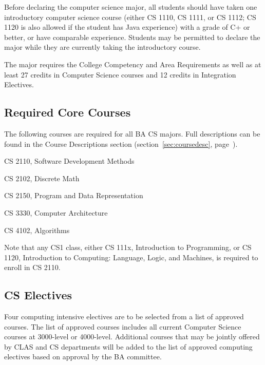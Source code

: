 

Before declaring the computer science major, all students should have
taken one introductory computer science course (either CS 1110, CS
1111, or CS 1112; CS 1120 is also allowed if the student has Java
experience) with a grade of C+ or better, or have comparable
experience. Students may be permitted to declare the major while they
are currently taking the introductory course.

The major requires the College Competency and Area
Requirements
as well as at least 27 credits in Computer Science courses and 12
credits in Integration Electives.

\subsection{Required Core Courses}
\label{sec:bacs-corecourses}

The following courses are required for all BA CS majors.  Full
descriptions can be found in the Course Descriptions section
(section~\ref{sec:coursedesc}, page~\pageref{sec:coursedesc}).

\begin{itemlist}
\item CS 2110, Software Development Methods
\item CS 2102, Discrete Math
\item CS 2150, Program and Data Representation
\item CS 3330, Computer Architecture
\item CS 4102, Algorithms
\end{itemlist}

Note that any CS1 class, either CS 111x, Introduction to Programming,
or CS 1120, Introduction to Computing: Language, Logic, and Machines,
is required to enroll in CS 2110.

\subsection{CS Electives}
\label{sec:bacs-cselectives}

Four computing intensive electives are to be selected from a list of
approved courses. The list of approved courses includes all 
current Computer Science courses at 3000-level or 4000-level. Additional 
courses that may be jointly offered by CLAS and CS
departments will be added to the list of approved computing electives
based on approval by the BA committee.

